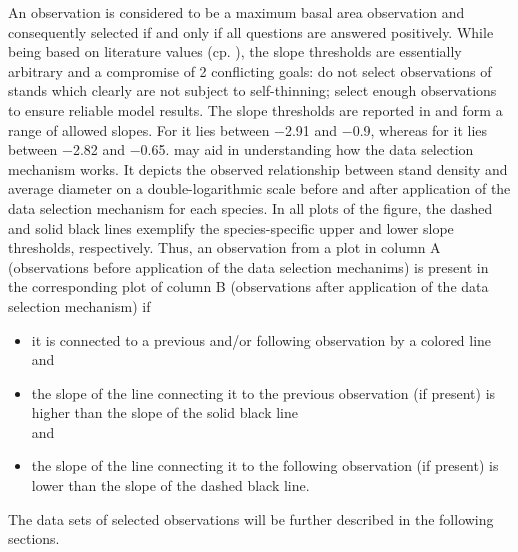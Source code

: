 An observation is considered to be a maximum basal area observation and consequently selected if and only if all questions are answered positively.  While being based on literature values (cp. ), the slope thresholds are essentially arbitrary and a compromise of 2 conflicting goals:  do not select observations of stands which clearly are not subject to self-thinning;  select enough observations to ensure reliable model results.  The slope thresholds are reported in  and form a range of allowed slopes.  For \Beech{} it lies between \num{-2.91} and \num{-0.9}, whereas for \Spruce{} it lies between \num{-2.82} and \num{-0.65}.
 may aid in understanding how the data selection mechanism works.  It depicts the observed relationship between stand density and average diameter on a double-logarithmic scale before and after application of the data selection mechanism for each species.  In all plots of the figure, the dashed and solid black lines exemplify the species-specific upper and lower slope thresholds, respectively.  Thus, an observation from a plot in column A (observations before application of the data selection mechanims) is present in the corresponding plot of column B (observations after application of the data selection mechanism) if
\begin{itemize}
\item it is connected to a previous and/or following observation by a colored line \\
  and
\item the slope of the line connecting it to the previous observation (if present) is higher than the slope of the solid black line \\
  and
\item the slope of the line connecting it to the following observation (if present) is lower than the slope of the dashed black line.
\end{itemize}

The data sets of selected observations will be further described in the following sections.

